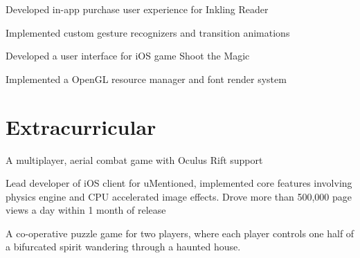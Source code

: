 \documentclass[letterpaper]{deedy-resume} %
\begin{document}
\begin{minipage}[t]{0.66\textwidth}


\begin{tightitemize}
\item Developed in-app purchase user experience for Inkling Reader
\item Implemented custom gesture recognizers and transition animations
\end{tightitemize}

\sectionspace %



\begin{tightitemize}
\item Developed a user interface for iOS game Shoot the Magic
\item Implemented a OpenGL resource manager and font render system
\end{tightitemize}

\sectionspace %


\section{Extracurricular}

A multiplayer, aerial combat game with Oculus Rift support

\sectionspace %

Lead developer of iOS client for uMentioned, implemented core features involving physics engine and CPU accelerated image effects. Drove more than 500,000 page views a day within 1 month of release

\sectionspace %



A co-operative puzzle game for two players, where each player controls one half of a bifurcated spirit wandering through a haunted house. 



\end{minipage}
\end{document}
